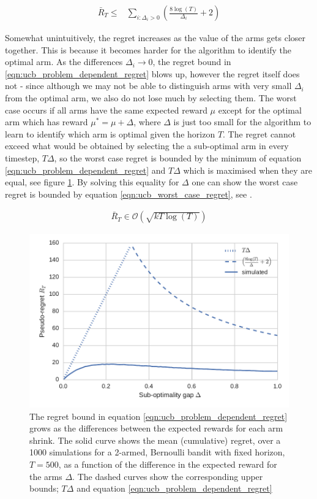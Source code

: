 \documentclass[11pt,a4paper,oneside]{book}
\newcommand{\eqn}[1]{\begin{align}#1\end{align}}
\newcommand{\bigo}[1]{\mathcal{O}\left( #1 \right)}
\newcommand{\regret}{\bar{R}_{T}} %
\theoremstyle{plain}
\theoremstyle{definition}
\begin{document}
\eqn {
\label{eqn:ucb_problem_dependent_regret}
\regret \leq & \sum_{i:\Delta_i > 0}\left(\frac{8\log(T)}{\Delta_i}+2 \right)
}

Somewhat unintuitively, the regret increases as the value of the arms gets closer together. This is because it becomes harder for the algorithm to identify the optimal arm. As the differences $\Delta_i \rightarrow 0$, the regret bound in \ref{eqn:ucb_problem_dependent_regret} blows up, however the regret itself does not - since although we may not be able to distinguish arms with very small $\Delta_i$ from the optimal arm, we also do not lose much by selecting them. The worst case occurs if all arms have the same expected reward $\mu$ except for the optimal arm which has reward $\mu^*=\mu+\Delta$, where $\Delta$ is just too small for the algorithm to learn to identify which arm is optimal given the horizon $T$. The regret cannot exceed what would be obtained by selecting the a sub-optimal arm in every timestep, $T\Delta$, so the worst case regret is bounded by the minimum of equation \ref{eqn:ucb_problem_dependent_regret} and $T\Delta$ which is maximised when they are equal, see figure \ref{fig:ucb_regret_vs_delta}. By solving this equality for $\Delta$ one can show the worst case regret is bounded by equation \ref{eqn:ucb_worst_case_regret}, see \citet{Bubeck2012}.

\eqn{
\label{eqn:ucb_worst_case_regret}
\regret \in \bigo{\sqrt{kT\log(T)}}
}  

\begin{figure}
\includegraphics[scale=1]{ucb_regret_vs_delta}
\caption{The regret bound in equation \ref{eqn:ucb_problem_dependent_regret} grows as the differences between the expected rewards for each arm shrink. The solid curve shows the mean (cumulative) regret, over a 1000 simulations for a 2-armed, Bernoulli bandit with fixed horizon, $T = 500$, as a function of the difference in the expected reward for the arms $\Delta$. The dashed curves show the corresponding upper bounds; $T\Delta$ and equation \ref{eqn:ucb_problem_dependent_regret}}
\label{fig:ucb_regret_vs_delta}
\end{figure}
\end{document}
